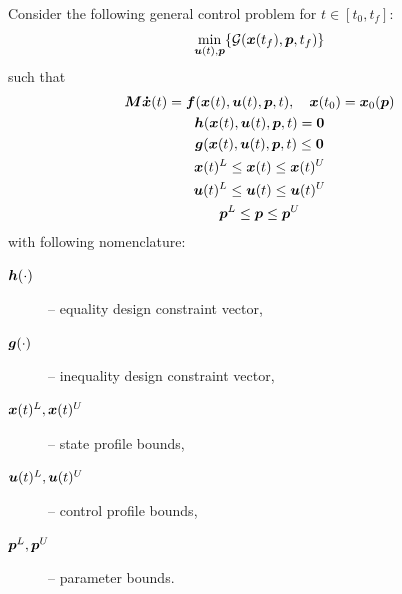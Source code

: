Consider the following general control problem for $t \in
[t_{0},t_{f}]$:
\begin{equation}
\min_{\ve{u}(t),\ve{p}}\{\mf{G}(\ve{x}(t_{f}),\ve{p},t_{f})\}
\label{eq:gencontprob} 
\end{equation}
such that
\begin{gather}
\ve{M\dot{x}}(t) = \ve{f}(\ve{x}(t),\ve{u}(t),\ve{p},t), \quad
\ve{x}(t_{0}) = \ve{x}_{0}(\ve{p})\nonumber\\  
\ve{h}(\ve{x}(t),\ve{u}(t),\ve{p},t) = \ve{0}\nonumber\\ 
\ve{g}(\ve{x}(t),\ve{u}(t),\ve{p},t) \leq \ve{0}\nonumber\\
\ve{x}(t)^{L} \leq \ve{x}(t) \leq \ve{x}(t)^{U}\nonumber\\ 
\ve{u}(t)^{L} \leq \ve{u}(t) \leq \ve{u}(t)^{U}\nonumber\\
\ve{p}^{L} \leq \ve{p} \leq \ve{p}^{U}\nonumber  
\end{gather}with following nomenclature:
\begin{description}
\item [$\ve{h}(\cdot)$] -- equality design constraint vector,
\item [$\ve{g}(\cdot)$] -- inequality design constraint vector,
\item [$\ve{x}(t)^{L},\ve{x}(t)^{U}$] -- state profile bounds, 
\item [$\ve{u}(t)^{L},\ve{u}(t)^{U}$] -- control profile bounds,
\item [$\ve{p}^{L},\ve{p}^{U}$] -- parameter bounds.
\end{description}

